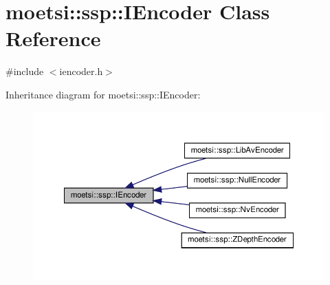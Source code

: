 \hypertarget{classmoetsi_1_1ssp_1_1IEncoder}{}\section{moetsi\+:\+:ssp\+:\+:I\+Encoder Class Reference}
\label{classmoetsi_1_1ssp_1_1IEncoder}


{\ttfamily \#include $<$iencoder.\+h$>$}



Inheritance diagram for moetsi\+:\+:ssp\+:\+:I\+Encoder\+:\nopagebreak
\begin{figure}[H]
\begin{center}
\leavevmode
\includegraphics[width=350pt]{classmoetsi_1_1ssp_1_1IEncoder__inherit__graph}
\end{center}
\end{figure}
